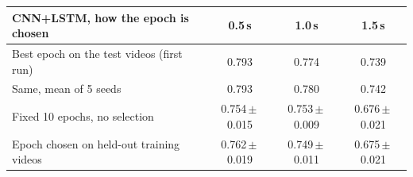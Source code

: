\scriptsize
\setlength{\tabcolsep}{2.5pt}
\begin{tabular}{@{}lccc@{}}
\toprule
CNN+LSTM, how the epoch is chosen & 0.5\,s & 1.0\,s & 1.5\,s \\
\midrule
Best epoch on the test videos (first run) & 0.793 & 0.774 & 0.739 \\
Same, mean of 5 seeds & 0.793 & 0.780 & 0.742 \\
Fixed 10 epochs, no selection & 0.754\,$\pm$\,0.015 & 0.753\,$\pm$\,0.009 & 0.676\,$\pm$\,0.021 \\
Epoch chosen on held-out training videos & 0.762\,$\pm$\,0.019 & 0.749\,$\pm$\,0.011 & 0.675\,$\pm$\,0.021 \\
\bottomrule
\end{tabular}
